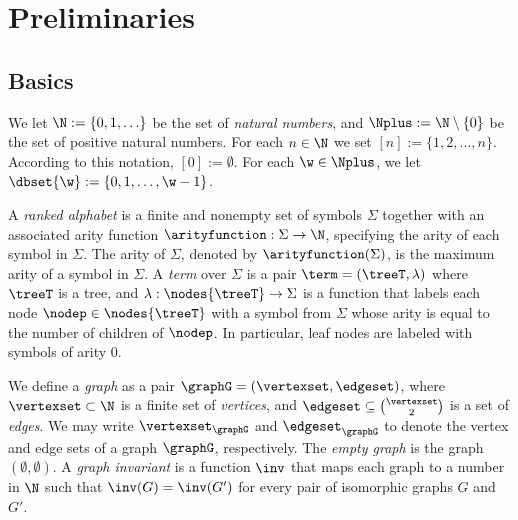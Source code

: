 \section{Preliminaries}

\subsection{Basics}
We let $\N:= \{0,1, \ldots \}$ be the set of {\em natural numbers}, 
and $\Nplus:= \N \setminus \{0\}$ be the set of positive natural numbers. 
For each $n \in \N$ we set $[n]:=\{1,2, \ldots,n\}$. According to this notation,
$[0]:= \emptyset$. For each $\w \in \Nplus$, we let $\dbset{\w}:= \{0,1,\ldots,
\w-1\}$. 


A \emph{ranked alphabet} is a finite and nonempty set of symbols $\Sigma$ together with an associated arity function $\arityfunction : \Sigma \rightarrow \N$, specifying the arity of each symbol in $\Sigma$. The arity of $\Sigma$, denoted by $\arityfunction(\Sigma)$, is the
maximum arity of a symbol in $\Sigma$. A \emph{term} over $\Sigma$ is a pair $\term = (\treeT, \lambda)$ where $\treeT$ is a tree, and $\lambda: \nodes{\treeT} \rightarrow \Sigma$ is a function that labels each node $\nodep \in \nodes{\treeT}$ with a symbol from $\Sigma$ whose arity is equal to the number of children of $\nodep$. In particular, leaf nodes are labeled with symbols of arity $0$. 

We define a \emph{graph} as a pair $\graphG = (\vertexset,\edgeset)$, where $\vertexset \subset \N$ is a finite set of \emph{vertices}, and $\edgeset \subseteq \binom{\vertexset}{2}$ is a set of \emph{edges}.
We may write $\vertexset_\graphG$ and $\edgeset_\graphG$ to denote the vertex and edge sets of a graph $\graphG$, respectively. The \emph{empty graph} is the graph $(\emptyset,\emptyset)$.
A \emph{graph invariant} is a function $\inv$ that maps each graph to a number in $\N$ such that $\inv(G) = \inv(G')$ for every pair of isomorphic graphs $G$ and $G'$. 





